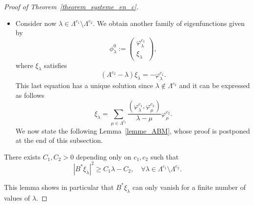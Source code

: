 \documentclass[AHL,Unicode,longabstracts]{cedram}
\newcommand{\fprop}[2]{\varphi^{#1}_{#2}}
\renewcommand{\cdot}{{\scriptstyle \bullet}}
\let\oldforall\forall
\renewcommand*{\forall}{\mathrel{\oldforall}}
\begin{document}
\begin{proof}[Proof of Theorem~\ref{theorem_systeme_en_c}]
\begin{itemize}
\begin{itemize}
\begin{itemize}
\item Assume now that $\beta_\lambda\neq 0$. In that case, $\lambda$ is geometrically simple but there exists a generalized eigenfunction $\phi_\lambda^1$ associated with $\phi_\lambda^0$ of the following form
\[
\phi_\lambda^1 := \frac{1}{\beta_\lambda}
\begin{pmatrix} \fprop{c_1}{\lambda} \\ \chi_\lambda
\end{pmatrix},
\]


where $\chi_\lambda$ is the unique solution of
\[
(A^{c_2} - \lambda) \chi_\lambda = \beta_\lambda \fprop{c_2}{\lambda} - \fprop{c_1}{\lambda},
\]
that satisfy $B^*\chi_\lambda=0$.

We can express $\chi_\lambda$ in the basis $\fprop{c_2}{\cdot}$ as follows
\[
\chi_\lambda=a_\lambda \fprop{c_2}{\lambda} - \sum_{\substack{\mu\in \Lambda^{c_2}\\ \mu \neq \lambda}} \frac{(\fprop{c_1}{\lambda},\fprop{c_2}{\mu})}{\lambda-\mu} \fprop{c_2}{\mu},
\]
with
\[
a_\lambda = \frac{1}{B^*\fprop{c_2}{\lambda}} \sum_{\substack{\mu\in \Lambda^{c_2}\\ \mu \neq \lambda}} \frac{(\fprop{c_1}{\lambda},\fprop{c_2}{\mu})}{\lambda-\mu} B^* \fprop{c_2}{\mu}.
\]
\end{itemize}
\end{itemize}
\item Consider now $\lambda\in \Lambda^{c_1}\setminus \Lambda^{c_2}$. We obtain another family of eigenfunctions given by
\begin{equation}\label{systeme_en_c_fp2}
\phi_\lambda^0 :=
\begin{pmatrix} \fprop{c_1}{\lambda} \\ \xi_\lambda
\end{pmatrix},
\end{equation}
where $\xi_\lambda$ satisfies
\[
(A^{c_2}-\lambda) \xi_\lambda = - \fprop{c_1}{\lambda}.
\]
This last equation has a unique solution since $\lambda\not\in \Lambda^{c_2}$ and it can be expressed as follows
\begin{equation}\label{def_xi_lambda}
\xi_\lambda = \sum_{\mu\in \Lambda^{c_2}} \frac{(\fprop{c_1}{\lambda},\fprop{c_2}{\mu})}{\lambda-\mu} \fprop{c_2}{\mu}.
\end{equation}
We now state the following Lemma~\ref{lemme_ABM}, whose proof is postponed at the end of this subsection.
\end{itemize}
\begin{lemm}\label{lemme_ABM}
There exists $C_1,C_2>0$ depending only on $c_1, c_2$ such that
\begin{equation}\label{ABM_xi_lambda}
|B^* \xi_\lambda|^2 \geq C_1 \lambda - C_2, \quad \forall \lambda\in \Lambda^{c_1}\setminus \Lambda^{c_2}.
\end{equation}
\end{lemm}
This lemma shows in particular that $B^* \xi_\lambda$ can only vanish for a finite number of values of $\lambda$.



\end{proof}
\end{document}
